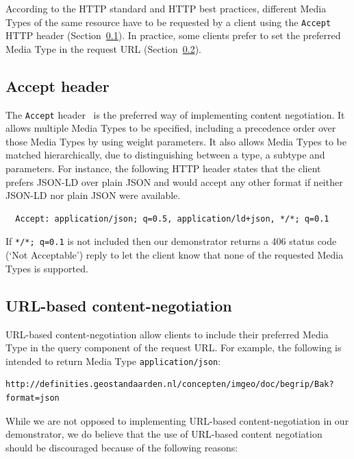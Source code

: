 \documentclass[a4paper]{scrartcl}
\newcommand{\textt}[1]{{\small \texttt{#1}}}
\begin{document}
According to the HTTP standard and HTTP best practices, different
Media Types of the same resource have to be requested by a client
using the \textt{Accept} HTTP header
(Section~\ref{sec:accept_header}).  In practice, some clients prefer
to set the preferred Media Type in the request URL
(Section~\ref{sec:url_based_content_negotiation}).


\subsection{Accept header}
\label{sec:accept_header}

The \textt{Accept} header~\cite{RFC7231} is the preferred way of
implementing content negotiation.  It allows multiple Media Types to
be specified, including a precedence order over those Media Types by
using weight parameters.  It also allows Media Types to be matched
hierarchically, due to distinguishing between a type, a subtype and
parameters.  For instance, the following HTTP header states that the
client prefers JSON-LD over plain JSON and would accept any other
format if neither JSON-LD nor plain JSON were available.

\begin{verbatim}
  Accept: application/json; q=0.5, application/ld+json, */*; q=0.1
\end{verbatim}

If \textt{*/*; q=0.1} is not included then our demonstrator returns a
406 status code (`Not Acceptable') reply to let the client know that
none of the requested Media Types is supported.


\subsection{URL-based content-negotiation}
\label{sec:url_based_content_negotiation}

URL-based content-negotiation allow clients to include their preferred
Media Type in the query component of the request URL.  For example,
the following is intended to return Media Type
\textt{application/json}:

\begin{verbatim}
http://definities.geostandaarden.nl/concepten/imgeo/doc/begrip/Bak?format=json
\end{verbatim}

While we are not opposed to implementing URL-based content-negotiation in
our demonstrator, we do believe that the use of URL-based content
negotiation should be discouraged because of the following reasons:
\end{document}
